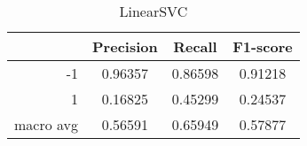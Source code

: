 \begin{table}[!h]
    \centering
    \renewcommand{\arraystretch}{1.5}
    \begin{tabular}{|r|c|c|c|}
        \hline
                  & Precision & Recall & F1-score \\ \hline
        -1        &     0.96357     &     0.86598   &    0.91218      \\ \hline
        1         &     0.16825      &     0.45299   &   0.24537       \\ \hline
        macro avg &      0.56591     &     0.65949   &    0.57877      \\ \hline
    \end{tabular}
    \caption{LinearSVC}
\end{table}

